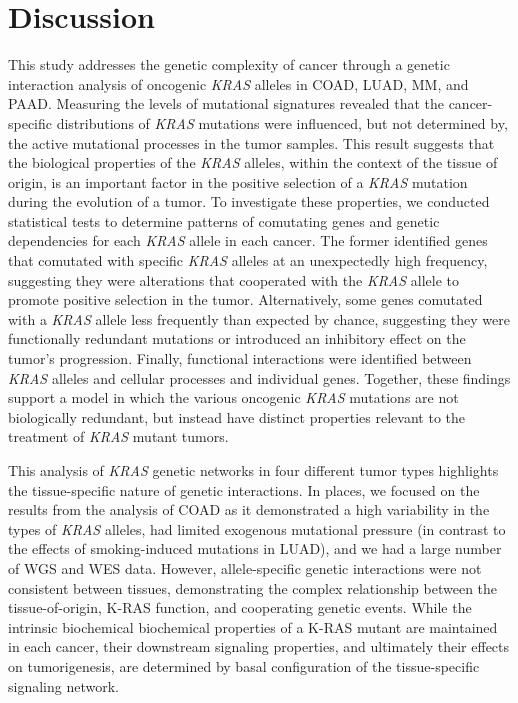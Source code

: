 \documentclass[english, 10pt, letterpaper]{article}
\newcommand{\KRAS}{\emph{KRAS}}
\newcommand{\kras}{K-RAS}
\begin{document}
\section*{Discussion}

This study addresses the genetic complexity of cancer through a genetic interaction analysis of oncogenic \KRAS{} alleles in COAD, LUAD, MM, and PAAD. 
Measuring the levels of mutational signatures revealed that the cancer-specific distributions of \KRAS{} mutations were influenced, but not determined by, the active mutational processes in the tumor samples.
This result suggests that the biological properties of the \KRAS{} alleles, within the context of the tissue of origin, is an important factor in the positive selection of a \KRAS{} mutation during the evolution of a tumor.
To investigate these properties, we conducted statistical tests to determine patterns of comutating genes and genetic dependencies for each \KRAS{} allele in each cancer.
The former identified genes that comutated with specific \KRAS{} alleles at an unexpectedly high frequency, suggesting they were alterations that cooperated with the \KRAS{} allele to promote positive selection in the tumor.
Alternatively, some genes comutated with a \KRAS{} allele less frequently than expected by chance, suggesting they were functionally redundant mutations or introduced an inhibitory effect on the tumor's progression.
Finally, functional interactions were identified between \KRAS{} alleles and cellular processes and individual genes.
Together, these findings support a model in which the various oncogenic \KRAS{} mutations are not biologically redundant, but instead have distinct properties relevant to the treatment of \KRAS{} mutant tumors.

This analysis of \KRAS{} genetic networks in four different tumor types highlights the tissue-specific nature of genetic interactions. 
In places, we focused on the results from the analysis of COAD as it demonstrated a high variability in the types of \KRAS{} alleles, had limited exogenous mutational pressure (in contrast to the effects of smoking-induced mutations in LUAD), and we had a large number of WGS and WES data.
However, allele-specific genetic interactions were not consistent between tissues, demonstrating the complex relationship between the tissue-of-origin, \kras{} function, and cooperating genetic events.
While the intrinsic biochemical biochemical properties of a \kras{} mutant are maintained in each cancer, their downstream signaling properties, and ultimately their effects on tumorigenesis, are determined by basal configuration of the tissue-specific signaling network.
\end{document}
